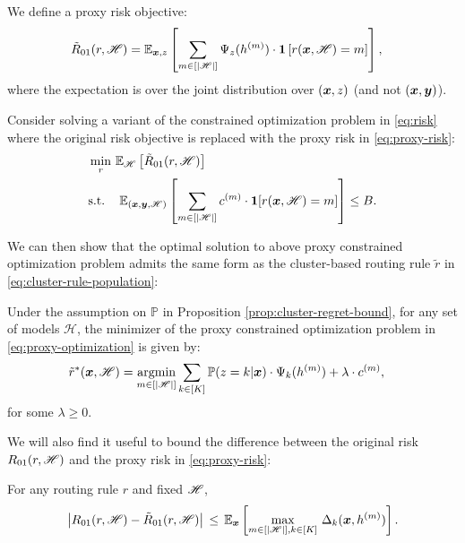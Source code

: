 We define a proxy risk objective:
\begin{align}
\tilde{R}_{01}(r,\mathscr{H})
& =
\mathbb{E}_{\boldsymbol{x},z}\left[
\sum_{m \in [|\mathscr{H}|]} \Psi_{z}(h^{(m)})\cdot\bm{1}\left[r(\boldsymbol{x}, \mathscr{H})=m\right]\right],
\label{eq:proxy-risk}
\end{align}
where the expectation is over the joint distribution over $(\boldsymbol{x},z)$ (and not $(\boldsymbol{x}, \boldsymbol{y})$). 

Consider solving a variant of the constrained optimization problem in \eqref{eq:risk} where the original risk objective is replaced with the proxy risk in \eqref{eq:proxy-risk}:
\begin{align}
 & \min_{r}\thinspace\mathbb{E}_{\mathscr{H}}\left[ \tilde{R}_{01}(r,\mathscr{H}) \right]\nonumber \\
 & \text{s.t.}~~~\thinspace\mathbb{E}_{(\boldsymbol{x}, \boldsymbol{y}, \mathscr{H})}\left[\sum_{m\in[|\mathscr{H}|]}c^{(m)} \cdot \bm{1}[r(\boldsymbol{x}, \mathscr{H})=m]\right]\le B.\label{eq:proxy-optimization}
 \end{align}


We can then show that the optimal solution to
above proxy constrained optimization problem admits the same form as the cluster-based routing rule $\tilde{r}$ in \eqref{eq:cluster-rule-population}:
\begin{lemma}
\label{lem:cluster-opt-rule}
Under the assumption on $\mathbb{P}$ in Proposition \ref{prop:cluster-regret-bound}, for any set of models $\mathscr{H}$, the minimizer of the proxy constrained optimization problem in \eqref{eq:proxy-optimization} is given by:
\begin{align*}
\tilde{r}^{*}(\boldsymbol{x}, \mathscr{H}) 
 & =\underset{m\in[|\mathscr{H}|]}{\operatorname{argmin}}\sum_{k\in[K]}\mathbb{P}(z=k|\boldsymbol{x}) \cdot \Psi_{k}(h^{(m)}) +\lambda \cdot c^{(m)},
\end{align*}
for some $\lambda \geq 0$.
\end{lemma}

We will also find it useful to bound the difference between the original risk $R_{01}(r, \mathscr{H})$ and the proxy risk in \eqref{eq:proxy-risk}:
\begin{lemma}
\label{lem:cluster-Delta-bound}
For any routing rule $r$ and fixed $\mathscr{H}$, 
\[
\left|R_{01}(r,\mathscr{H}) - \tilde{R}_{01}(r,\mathscr{H})\right| \,\leq\,
\mathbb{E}_{\boldsymbol{x}}\left[\max_{m\in[|\mathscr{H}|], k\in[K]}\,\Delta_{k}(\boldsymbol{x}, h^{(m)})\right].
\]
\end{lemma}


